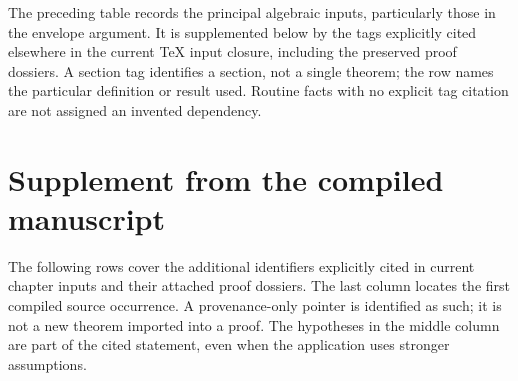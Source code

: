 \begin{remark}
\label{rem:stacks-ledger-scope}
The preceding table records the principal algebraic inputs, particularly
those in the envelope argument.  It is supplemented below by the tags
explicitly cited elsewhere in the current TeX input closure, including the
preserved proof dossiers.  A section tag identifies a section, not a single
theorem; the row names the particular definition or result used.  Routine
facts with no explicit tag citation are not assigned an invented dependency.
\end{remark}


\section{Supplement from the compiled manuscript}
\label{sec:stacks-compiled-supplement}

The following rows cover the additional identifiers explicitly cited in
current chapter inputs and their attached proof dossiers.  The last column
locates the first compiled source occurrence.  A provenance-only pointer
is identified as such; it is not a new theorem imported into a proof.
The hypotheses in the middle column are part of the cited statement, even
when the application uses stronger assumptions.

